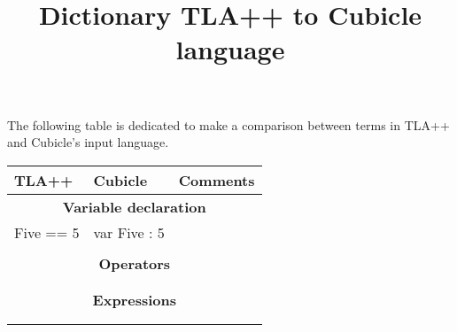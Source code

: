 \documentclass{article}
\title{Dictionary TLA++ to Cubicle language}
\begin{document}

\maketitle

The following table is dedicated to make a comparison between terms in TLA++ and Cubicle's  input language. 

\vspace{1 cm	}


\begin{tabular}{ |p{3cm}||p{3cm}|p{7cm}|  }
 \hline

 \textbf{TLA++} & \textbf{ Cubicle}  & \textbf{ Comments }\\
 \hline
  \hline
 \multicolumn{3}{|c|}{ \textbf{Variable declaration}}	 \\
 \hline
   Five == 5  &  var Five : 5   &\\

    &     &\\
 \hline
 \multicolumn{3}{|c|}{ \textbf{Operators} } \\
 \hline

   &     &\\

    &     &\\
  \hline

   \multicolumn{3}{|c|}{ \textbf{Expressions} } \\
 \hline

   &     &\\

    &     &\\
  \hline
\end{tabular}
\end{document}
